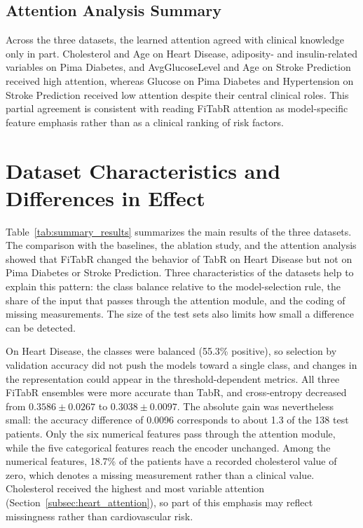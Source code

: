 \documentclass[11pt,a4paper,oneside, openany, reqno, chapter, nokorean]{oblivoir}
\theoremstyle{definition}
\theoremstyle{remark}
\numberwithin{equation}{chapter}
\theoremstyle{definition}
\theoremstyle{remark}
\theoremstyle{definition}
\begin{document}
\subsection{Attention Analysis Summary}
\label{subsec:attention_summary}

Across the three datasets, the learned attention agreed with clinical
knowledge only in part. Cholesterol and Age on Heart Disease, adiposity- and
insulin-related variables on Pima Diabetes, and AvgGlucoseLevel and Age
on Stroke Prediction received high attention, whereas Glucose on Pima
Diabetes and Hypertension on Stroke Prediction received low attention despite
their central clinical roles. This partial agreement is consistent with
reading FiTabR attention as model-specific feature emphasis rather than as a
clinical ranking of risk factors.

\FloatBarrier
\section{Dataset Characteristics and Differences in Effect}
\label{sec:dataset_discussion}

Table~\ref{tab:summary_results} summarizes the main results of the three
datasets. The comparison with the baselines, the ablation study, and the
attention analysis showed that FiTabR changed the behavior of TabR on Heart
Disease but not on Pima Diabetes or Stroke Prediction. Three characteristics
of the datasets help to explain this pattern: the class balance relative to
the model-selection rule, the share of the input that passes through the
attention module, and the coding of missing measurements. The size of the
test sets also limits how small a difference can be detected.

On Heart Disease, the classes were balanced (55.3\% positive), so selection
by validation accuracy did not push the models toward a single class, and
changes in the representation could appear in the threshold-dependent
metrics. All three FiTabR ensembles were more accurate than TabR, and
cross-entropy decreased from $0.3586 \pm 0.0267$ to $0.3038 \pm 0.0097$.
The absolute gain was nevertheless small: the accuracy difference of 0.0096
corresponds to about 1.3 of the 138 test patients. Only the six numerical
features pass through the attention module, while the five categorical
features reach the encoder unchanged. Among the numerical features, 18.7\%
of the patients have a recorded cholesterol value of zero, which denotes a
missing measurement rather than a clinical value. Cholesterol received the
highest and most variable attention (Section~\ref{subsec:heart_attention}),
so part of this emphasis may reflect missingness rather than cardiovascular
risk.
\end{document}
